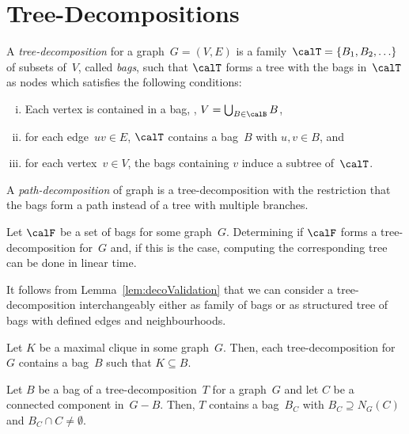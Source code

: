 \section{Tree-Decompositions}
    \label{sec:treeDecoDef}

A \emph{tree-decomposition} for a graph~$G = (V, E)$ is a family~$\calT = \{ B_1, B_2, \ldots \}$ of subsets of~$V$, called \emph{bags}, such that $\calT$ forms a tree with the bags in~$\calT$ as nodes which satisfies the following conditions:
\begin{enumerate}[(i),mode=unboxed]
    \item
        Each vertex is contained in a bag, \ie, $V = \bigcup_{B \in \calB} B$,
    \item
        for each edge~$uv \in E$, $\calT$ contains a bag~$B$ with $u, v \in B$, and
    \item
        for each vertex~$v \in V$, the bags containing $v$ induce a subtree of~$\calT$.
\end{enumerate}
A \emph{path-decomposition} of graph is a tree-decomposition with the restriction that the bags form a path instead of a tree with multiple branches.

\begin{lemma}
    \label{lem:decoValidation}
Let \( \calF \) be a set of bags for some graph~\( G \).
Determining if \( \calF \) forms a tree-decomposition for~\( G \) and, if this is the case, computing the corresponding tree can be done in linear time.
\end{lemma}

It follows from Lemma~\ref{lem:decoValidation} that we can consider a tree-decomposition interchangeably either as family of bags or as structured tree of bags with defined edges and neighbourhoods. 

\begin{lemma}
    \label{lem:cliqueBag}
Let \( K \) be a maximal clique in some graph~\( G \).
Then, each tree-decomposition for~\( G \) contains a bag~\( B \) such that \( K \subseteq B \).
\end{lemma}

\begin{lemma}
    \label{lem:decoBorderBags}
Let \( B \) be a bag of a tree-decomposition~\( T \) for a graph~\( G \) and let \( C \) be a connected component in~\( G - B \).
Then, \( T \) contains a bag~\( B_C \) with \( B_C \supseteq N_G(C) \) and \( B_C \cap C \neq \emptyset \).
\end{lemma}

